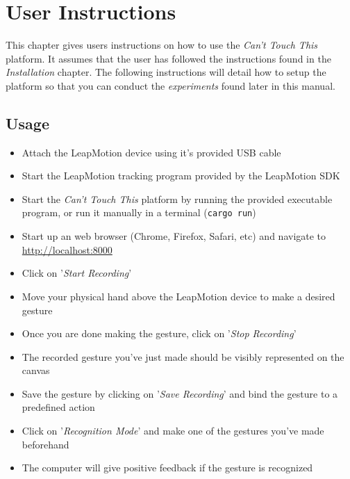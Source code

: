 \documentclass{standalone}
\begin{document}
  \section{User Instructions}
  This chapter gives users instructions on how to use the \textit{Can't Touch
    This} platform. It assumes that the user has followed the instructions found
  in the \textit{Installation} chapter. The following instructions will detail
  how to setup the platform so that you can conduct the \textit{experiments}
  found later in this manual.



  \subsection{Usage}
  \begin{itemize}
    \tightlist{}
    \item Attach the LeapMotion device using it's provided USB cable
    \item Start the LeapMotion tracking program provided by the LeapMotion SDK
    \item Start the \textit{Can't Touch This} platform by running the provided
      executable program, or run it manually in a terminal (\verb_cargo run_)
    \item Start up an web browser (Chrome, Firefox, Safari, etc) and navigate to
      \\ \url{http://localhost:8000}
    \item Click on '\textit{Start Recording}'
    \item Move your physical hand above the LeapMotion device to make a desired
      gesture
    \item Once you are done making the gesture, click on
      '\textit{Stop Recording}'
    \item The recorded gesture you've just made should be visibly represented on
      the canvas
    \item Save the gesture by clicking on '\textit{Save Recording}' and bind the
      gesture to a predefined action
    \item Click on '\textit{Recognition Mode}' and make one of the gestures
      you've made beforehand
    \item The computer will give positive feedback if the gesture is recognized
  \end{itemize}
  \clearpage
\end{document}
